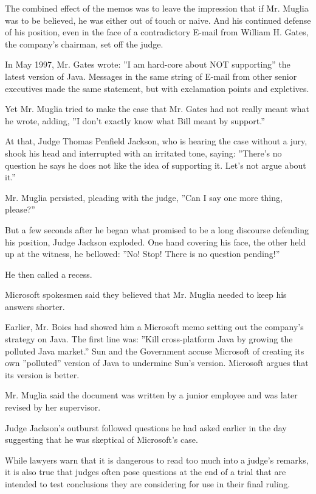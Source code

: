 The combined effect of the memos was to leave the impression that if Mr.
Muglia was to be believed, he was either out of touch or naive. And his
continued defense of his position, even in the face of a contradictory
E-mail from William H. Gates, the company's chairman, set off the judge.

In May 1997, Mr. Gates wrote: ''I am hard-core about NOT supporting''
the latest version of Java. Messages in the same string of E-mail from
other senior executives made the same statement, but with exclamation
points and expletives.

Yet Mr. Muglia tried to make the case that Mr. Gates had not really
meant what he wrote, adding, ''I don't exactly know what Bill meant by
support.''

At that, Judge Thomas Penfield Jackson, who is hearing the case without
a jury, shook his head and interrupted with an irritated tone, saying:
''There's no question he says he does not like the idea of supporting
it. Let's not argue about it.''

Mr. Muglia persisted, pleading with the judge, ''Can I say one more
thing, please?''

But a few seconds after he began what promised to be a long discourse
defending his position, Judge Jackson exploded. One hand covering his
face, the other held up at the witness, he bellowed: ''No! Stop! There
is no question pending!''

He then called a recess.

Microsoft spokesmen said they believed that Mr. Muglia needed to keep
his answers shorter.

Earlier, Mr. Boies had showed him a Microsoft memo setting out the
company's strategy on Java. The first line was: ''Kill cross-platform
Java by growing the polluted Java market.'' Sun and the Government
accuse Microsoft of creating its own ''polluted'' version of Java to
undermine Sun's version. Microsoft argues that its version is better.

Mr. Muglia said the document was written by a junior employee and was
later revised by her supervisor.

Judge Jackson's outburst followed questions he had asked earlier in the
day suggesting that he was skeptical of Microsoft's case.

While lawyers warn that it is dangerous to read too much into a judge's
remarks, it is also true that judges often pose questions at the end of
a trial that are intended to test conclusions they are considering for
use in their final ruling.

